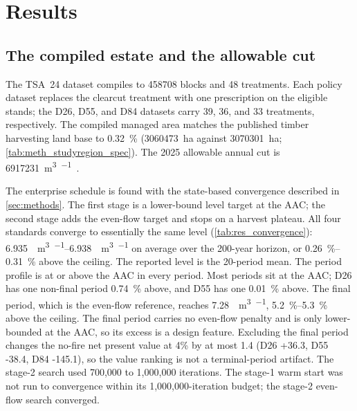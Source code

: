 \section{Results}
\label{sec:results}

\subsection{The compiled estate and the allowable cut}

The TSA~24 dataset compiles to \num{458708} blocks and 48 treatments. Each policy dataset replaces
the clearcut treatment with one prescription on the eligible stands; the D26, D55, and D84 datasets
carry 39, 36, and 33 treatments, respectively. The compiled managed area matches the published timber harvesting land base to
\SI{0.32}{\percent} (\SI{3060473}{\hectare} against \SI{3070301}{\hectare};
\autoref{tab:meth_studyregion_spec}). The 2025 allowable annual cut is
\SI{6917231}{\cubic\meter\per\year}~\citep{government_of_british_columbia_aac_2026}.

The enterprise schedule is found with the state-based convergence described in
\autoref{sec:methods}. The first stage is a lower-bound level target at the AAC; the second stage
adds the even-flow target and stops on a harvest plateau. All four standards converge to essentially the same
level (\autoref{tab:res_convergence}): \SIrange{6.935}{6.938}{\mega\cubic\meter\per\year} on
average over the 200-year horizon, or \SIrange{0.26}{0.31}{\percent} above the ceiling. The
reported level is the 20-period mean. The period profile is at or above the AAC in every period.
Most periods sit at the AAC; D26 has one non-final period \SI{0.74}{\percent} above, and D55 has
one \SI{0.01}{\percent} above. The final period, which is the even-flow reference, reaches
\SI{7.28}{\mega\cubic\meter\per\year}, \SIrange{5.2}{5.3}{\percent} above the ceiling. The final
period carries no even-flow penalty and is only lower-bounded at the AAC, so its excess is a design
feature. Excluding the final period changes the no-fire net present value at 4\% by
at most \SI{1.4}{\millionCAD} (D26 +\SI{36.3}{\millionCAD}, D55 -\SI{38.4}{\millionCAD}, D84
-\SI{145.1}{\millionCAD}), so the value ranking is not a terminal-period artifact. The stage-2
search used 700,000 to 1,000,000 iterations. The stage-1 warm start was not run to convergence
within its 1,000,000-iteration budget; the stage-2 even-flow search converged.

